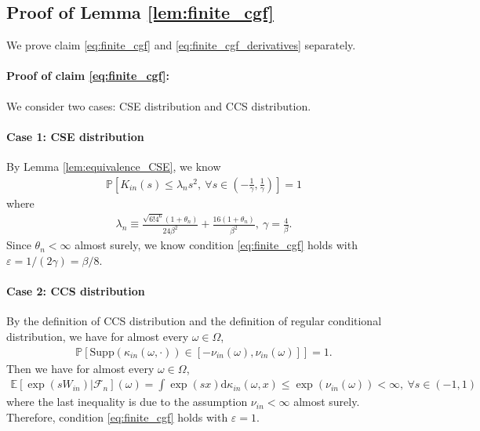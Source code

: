 \documentclass[12pt]{article}
\theoremstyle{definition}
\def\P{\mathbb{P}}
\def\P{\mathbb{P}}
\newcommand{\E}{\mathbb E}								%
\renewcommand{\P}{\mathbb{P}}							%
\begin{document}
\subsection{Proof of Lemma \ref{lem:finite_cgf}}

We prove claim \eqref{eq:finite_cgf} and \eqref{eq:finite_cgf_derivatives} separately. 

\paragraph{Proof of claim \eqref{eq:finite_cgf}:}

We consider two cases: CSE distribution and CCS distribution.

\paragraph{Case 1: CSE distribution}

By Lemma \ref{lem:equivalence_CSE}, we know 
\begin{align*}
	\P\left[K_{in}(s)\leq \lambda_ns^2,\ \forall s\in \left(-\frac{1}{\gamma},\frac{1}{\gamma}\right)\right]=1
\end{align*}
where 
\begin{align*}
	\lambda_n\equiv \frac{\sqrt{6!4^6}(1+\theta_{n})}{24\beta^2}+\frac{16(1+\theta_{n})}{\beta^2},\ \gamma=\frac{4}{\beta}.
\end{align*}
Since $\theta_n<\infty$ almost surely, we know condition \eqref{eq:finite_cgf} holds with $\varepsilon=1/(2\gamma)=\beta/8$.

\paragraph{Case 2: CCS distribution}

By the definition of CCS distribution and the definition of regular conditional distribution, we have for almost every $\omega\in\Omega$,
\begin{align*}
	\P\left[\mathrm{Supp}(\kappa_{in}(\omega,\cdot))\in [-\nu_{in}(\omega),\nu_{in}(\omega)]\right]=1.
\end{align*}
Then we have for almost every $\omega\in\Omega$,
\begin{align*}
	\E[\exp(sW_{in})|\mathcal{F}_n](\omega)=\int \exp(sx)\mathrm{d}\kappa_{in}(\omega,x)\leq \exp(\nu_{in}(\omega))<\infty,\ \forall s\in (-1,1)
\end{align*}
where the last inequality is due to the assumption $\nu_{in}<\infty$ almost surely. Therefore, condition \eqref{eq:finite_cgf} holds with $\varepsilon=1$.
\end{document}
